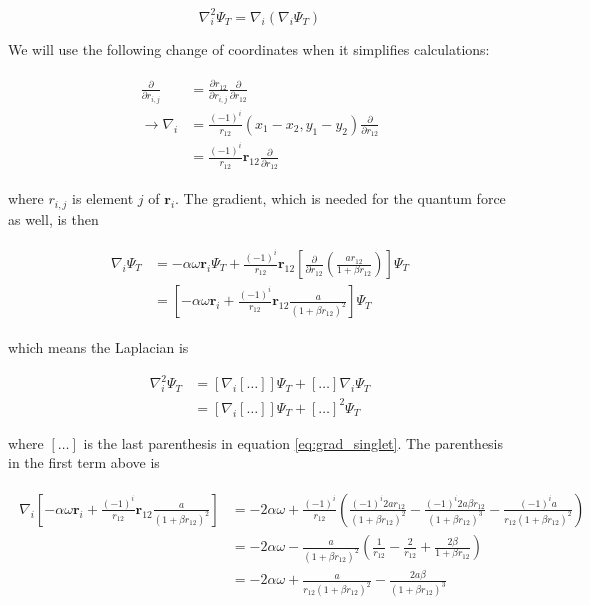 \documentclass[english, a4paper]{article}
\newcommand{\bm}[1]{\mathbf{#1}}
\begin{document}
	\begin{equation}
	\nabla_i^2 \Psi_T = \nabla_i(\nabla_i\Psi_T)
	\end{equation}
	
	We will use the following change of coordinates when it simplifies calculations:
	
	\begin{align}
	\begin{split}
	\frac{\partial}{\partial r_{i,j}} &= \frac{\partial r_{12}}{\partial r_{i,j}}\frac{\partial}{\partial r_{12}}\\
	\rightarrow \nabla_i &= \frac{(-1)^i}{r_{12}}(x_1-x_2, y_1-y_2)\frac{\partial}{\partial r_{12}}\\
	&= \frac{(-1)^i}{r_{12}}\bm{r}_{12}\frac{\partial}{\partial r_{12}}
	\end{split}
	\label{eq:coord_change_nabla}
	\end{align}
	
	where $r_{i,j}$ is element $j$ of $\bm{r}_i$.
	The gradient, which is needed for the quantum force as well, is then
	
	\begin{align}
	\begin{split}
	\nabla_i\Psi_T &= -\alpha\omega\bm{r}_i\Psi_T + \frac{(-1)^i}{r_{12}}\bm{r}_{12}\left[\frac{\partial}{\partial r_{12}}\left(\frac{ar_{12}}{1+\beta r_{12}}\right)\right]\Psi_T\\
	&= \left[-\alpha\omega\bm{r}_i + \frac{(-1)^i}{r_{12}}\bm{r}_{12}\frac{a}{(1+\beta r_{12})^2}\right]\Psi_T
	\end{split}
	\label{eq:grad_singlet}
	\end{align} 
	
	which means the Laplacian is
	
	\begin{equation}
	\begin{split}
	\nabla_i^2\Psi_T &= \left[\nabla_i[\ldots]\right]\Psi_T + [\ldots]\nabla_i\Psi_T\\
	&= \left[\nabla_i[\ldots]\right]\Psi_T + [\ldots]^2\Psi_T
	\end{split}
	\end{equation}
	
	where $[\ldots]$ is the last parenthesis in equation \ref{eq:grad_singlet}. The parenthesis in the first term above is
	
	\begin{align}
	\begin{split}
	\nabla_i\left[-\alpha\omega\bm{r}_i + \frac{(-1)^i}{r_{12}}\bm{r}_{12}\frac{a}{(1+\beta r_{12})^2}\right] &= -2\alpha\omega + \frac{(-1)^i}{r_{12}}\left( \frac{(-1)^i2ar_{12}}{(1+\beta r_{12})^2} - \frac{(-1)^i2a\beta r_{12}}{(1+\beta r_{12})^3} - \frac{(-1)^ia}{r_{12}(1+\beta r_{12})^2}\right)\\
	&= -2\alpha\omega - \frac{a}{(1+\beta r_{12})^2}\left( \frac{1}{r_{12}} - \frac{2}{r_{12}} + \frac{2\beta}{1+\beta r_{12}}\right)\\
	&= -2\alpha\omega + \frac{a}{r_{12}(1+\beta r_{12})^2}- \frac{2a\beta}{(1+\beta r_{12})^3}
	\end{split}
	\end{align}
	
\end{document}
